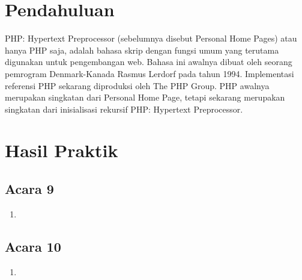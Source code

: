 \documentclass[a4paper]{article}
\begin{document}
\newpage
\begin{center}
\tableofcontents
\end{center}


\newpage
\section{Pendahuluan}
PHP: Hypertext Preprocessor (sebelumnya disebut Personal Home Pages) atau hanya PHP saja, adalah bahasa skrip dengan fungsi umum yang terutama digunakan untuk pengembangan web. Bahasa ini awalnya dibuat oleh seorang pemrogram Denmark-Kanada Rasmus Lerdorf pada tahun 1994. Implementasi referensi PHP sekarang diproduksi oleh The PHP Group. PHP awalnya merupakan singkatan dari Personal Home Page, tetapi sekarang merupakan singkatan dari inisialisasi rekursif PHP: Hypertext Preprocessor. \autocite{wikiphp}


\newpage
\section{Hasil Praktik}

\hfill \break

\subsection{Acara 9}
  \begin{center}

  \begin{enumerate}
    \item 

  \end{enumerate}

  \end{center}
\subsection{Acara 10}
  \begin{center}

  \begin{enumerate}
    \item 


  \end{enumerate}

  \end{center}
\end{document}
